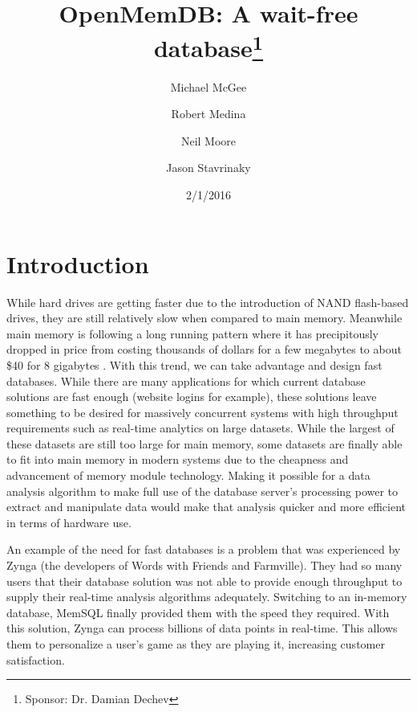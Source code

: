 \documentclass[letter,11pt]{article}
\title{OpenMemDB: A wait-free database\thanks{Sponsor: Dr. Damian Dechev}}
\author{Michael McGee \and Robert Medina \and Neil Moore \and Jason Stavrinaky}
\date{2/1/2016}
\begin{document}
\maketitle
\newpage


\section{Introduction}
While hard drives are getting faster due to the introduction of NAND flash-based drives,
they are still relatively slow when compared to main memory. Meanwhile main memory is following a long running 
pattern where it has precipitously dropped in price from costing thousands of dollars for a few 
megabytes to about \$40 for 8 gigabytes \cite{jcmit}. With this trend, we can take 
advantage and design fast databases. While there are many applications for 
which current database solutions are fast enough (website logins for example), these 
solutions leave something to be desired for massively concurrent systems with high throughput
requirements such as real-time analytics on large datasets. While the largest of 
these datasets are still too large for main memory, some datasets are finally able
to fit into main memory in modern systems due to the cheapness and advancement of 
memory module technology. Making it possible for a data analysis algorithm to make 
full use of the database server's processing power to extract and manipulate data
would make that analysis quicker and more efficient in terms of hardware use.
\par\vspace{\baselineskip}
An example of the need for fast databases is a problem that was experienced by Zynga 
(the developers of Words with Friends and Farmville). They had so many users that their 
database solution was not able to provide enough throughput to supply their real-time 
analysis algorithms adequately. Switching to an in-memory database, MemSQL finally 
provided them with the speed they required. With this solution, Zynga can process 
billions of data points in real-time. This allows them to personalize a user's game 
as they are playing it, increasing customer satisfaction.
\end{document}
